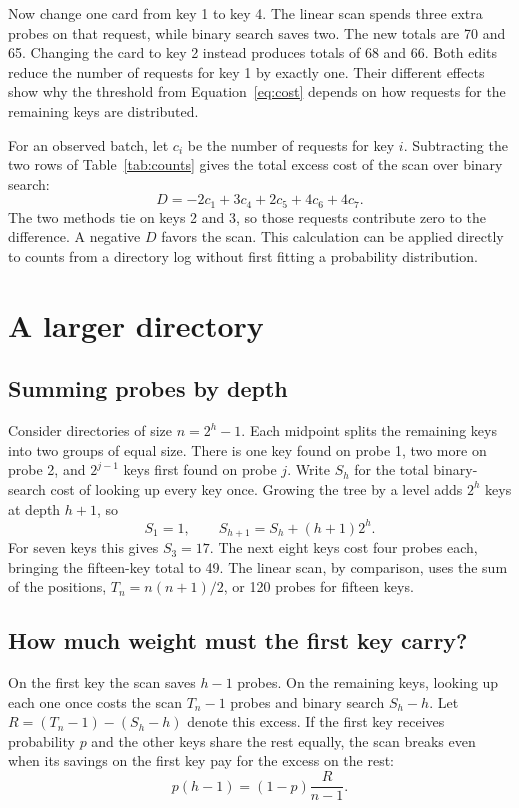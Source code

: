 \documentclass[lang=en]{fduthesis}
\begin{document}
Now change one card from key 1 to key 4. The linear scan spends three extra
probes on that request, while binary search saves two. The new totals are 70
and 65. Changing the card to key 2 instead produces totals of 68 and 66.
Both edits reduce the number of requests for key 1 by exactly one. Their
different effects show why the threshold from Equation~\ref{eq:cost} depends
on how requests for the remaining keys are distributed.

For an observed batch, let $c_i$ be the number of requests for key $i$.
Subtracting the two rows of Table~\ref{tab:counts} gives the total excess
cost of the scan over binary search:
\begin{equation}
  D=-2c_1+3c_4+2c_5+4c_6+4c_7.
  \label{eq:batch}
\end{equation}
The two methods tie on keys 2 and 3, so those requests contribute zero to
the difference. A negative $D$ favors the scan. This calculation can be
applied directly to counts from a directory log without first fitting a
probability distribution.

\chapter{A larger directory}
\section{Summing probes by depth}
Consider directories of size $n=2^h-1$. Each midpoint splits the remaining
keys into two groups of equal size. There is one key found on probe 1, two
more on probe 2, and $2^{j-1}$ keys first found on probe $j$. Write $S_h$
for the total binary-search cost of looking up every key once. Growing the
tree by a level adds $2^h$ keys at depth $h+1$, so
\begin{equation}
  S_1=1, \qquad S_{h+1}=S_h+(h+1)2^h .
  \label{eq:level}
\end{equation}
For seven keys this gives $S_3=17$. The next eight keys cost four probes
each, bringing the fifteen-key total to 49. The linear scan, by comparison,
uses the sum of the positions, $T_n=n(n+1)/2$, or 120 probes for fifteen keys.

\section{How much weight must the first key carry?}
On the first key the scan saves $h-1$ probes. On the remaining keys, looking
up each one once costs the scan $T_n-1$ probes and binary search $S_h-h$.
Let $R=(T_n-1)-(S_h-h)$ denote this excess. If the first key receives
probability $p$ and the other keys share the rest equally, the scan breaks
even when its savings on the first key pay for the excess on the rest:
\begin{equation}
  p(h-1)=(1-p)\frac{R}{n-1}.
  \label{eq:size-threshold}
\end{equation}
\end{document}
